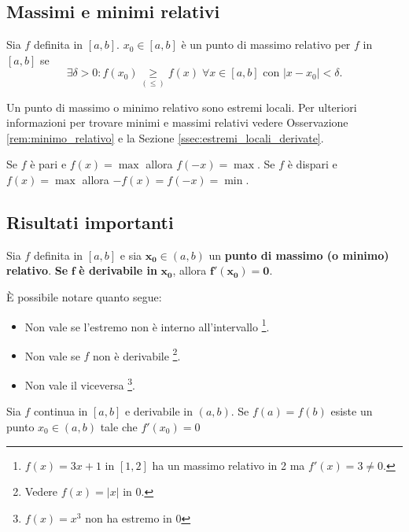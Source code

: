 \subsection{Massimi e minimi relativi}
\begin{definition}
    Sia $f$ definita in $[a,b]$. $x_0\in[a,b]$ è un punto di massimo relativo per $f$ in $[a,b]$ se
    \begin{equation*}
        \exists\delta>0\colon f(x_0)\underset{(\leq)}{\geq} f(x)\;\forall x\in[a,b] \text{ con } |x-x_0|<\delta.
    \end{equation*}
\end{definition}

Un punto di massimo o minimo relativo sono estremi locali. Per ulteriori informazioni per trovare minimi e massimi relativi vedere Osservazione \ref{rem:minimo_relativo} e la Sezione \ref{ssec:estremi_locali_derivate}.

\begin{remark}
    Se $f$ è pari e $f(x)=\max$ allora $f(-x)=\max$. Se $f$ è dispari e $f(x)=\max$ allora $-f(x)=f(-x)=\min$.
\end{remark}

\subsection{Risultati importanti}
\begin{theorem}[Fermat]\label{th:fermat_an1}
    Sia $f$ definita in $[a,b]$ e sia $\boldsymbol{x_0}\in(a,b)$ un \textbf{punto di massimo (o minimo) relativo}. \textbf{Se} $\boldsymbol f$ \textbf{è derivabile in} $\boldsymbol{x_0}$, allora $\boldsymbol{f'(x_0)=0}$.
\end{theorem}

\begin{remark}
    È possibile notare quanto segue:
    \begin{itemize}
        \item Non vale se l'estremo non è interno all'intervallo \footnote{$f(x)=3x+1$ in $[1,2]$ ha un massimo relativo in 2 ma $f'(x)=3\neq 0$.}.
        \item Non vale se $f$ non è derivabile \footnote{Vedere $f(x)=|x|$ in 0.}.
        \item Non vale il viceversa \footnote{$f(x)=x^3$ non ha estremo in 0}.
    \end{itemize}
\end{remark}

\begin{theorem}
    Sia $f$ continua in $[a,b]$ e derivabile in $(a,b)$. Se $f(a)=f(b)$ esiste un punto $x_0\in(a,b)$ tale che $f'(x_0)=0$
\end{theorem}


